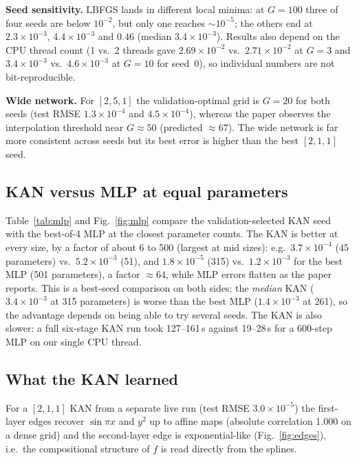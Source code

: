 \textbf{Seed sensitivity.} LBFGS lands in different local minima: at $G{=}100$ three of four seeds are below $10^{-2}$, but only one reaches $\sim\!10^{-5}$; the others end at $2.3\times10^{-3}$, $4.4\times10^{-3}$ and $0.46$ (median $3.4\times10^{-3}$). Results also depend on the CPU thread count (1 vs.\ 2 threads gave $2.69\times10^{-2}$ vs.\ $2.71\times10^{-2}$ at $G{=}3$ and $3.4\times10^{-3}$ vs.\ $4.6\times10^{-3}$ at $G{=}10$ for seed~0), so individual numbers are not bit-reproducible.

\textbf{Wide network.} For $[2,5,1]$ the validation-optimal grid is $G{=}20$ for both seeds (test RMSE $1.3\times10^{-4}$ and $4.5\times10^{-4}$), whereas the paper observes the interpolation threshold near $G{\approx}50$ (predicted $\approx67$). The wide network is far more consistent across seeds but its best error is higher than the best $[2,1,1]$ seed.

\subsection{KAN versus MLP at equal parameters}
Table~\ref{tab:mlp} and Fig.~\ref{fig:mlp} compare the validation-selected KAN seed with the best-of-4 MLP at the closest parameter counts. The KAN is better at every size, by a factor of about 6 to 500 (largest at mid sizes): e.g.\ $3.7\times10^{-4}$ (45 parameters) vs.\ $5.2\times10^{-3}$ (51), and $1.8\times10^{-5}$ (315) vs.\ $1.2\times10^{-3}$ for the best MLP (501 parameters), a factor $\approx64$, while MLP errors flatten as the paper reports. This is a best-seed comparison on both sides; the \emph{median} KAN ($3.4\times10^{-3}$ at 315 parameters) is worse than the best MLP ($1.4\times10^{-3}$ at 261), so the advantage depends on being able to try several seeds. The KAN is also slower: a full six-stage KAN run took 127--161\,s against 19--28\,s for a 600-step MLP on our single CPU thread.

\subsection{What the KAN learned}
For a $[2,1,1]$ KAN from a separate live run (test RMSE $3.0\times10^{-5}$) the first-layer edges recover $\sin\pi x$ and $y^2$ up to affine maps (absolute correlation 1.000 on a dense grid) and the second-layer edge is exponential-like (Fig.~\ref{fig:edges}), i.e.\ the compositional structure of $f$ is read directly from the splines.

